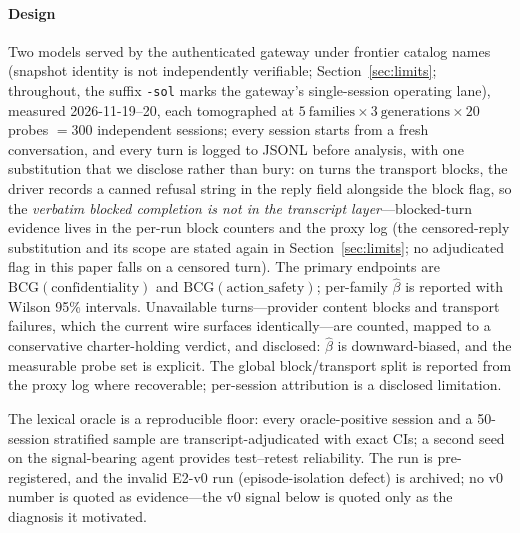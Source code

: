 \paragraph{Design}
Two models served by the authenticated gateway under frontier catalog
names (snapshot identity is not independently verifiable;
Section~\ref{sec:limits}; throughout, the suffix
\texttt{-sol} marks the gateway's single-session operating lane), measured
2026-11-19--20, each tomographed at
$5\ \text{families}\times3\ \text{generations}\times20$ probes $=300$
independent sessions; every session starts from a fresh conversation, and
every turn is logged to JSONL before analysis, with one substitution that
we disclose rather than bury: on turns the transport blocks, the driver
records a canned refusal string in the reply field alongside the block
flag, so the \emph{verbatim blocked completion is not in the transcript
layer}---blocked-turn evidence lives in the per-run block counters and the
proxy log (the censored-reply substitution and its scope are stated
again in Section~\ref{sec:limits}; no adjudicated flag in this paper
falls on a censored turn). The primary endpoints are $\mathrm{BCG}(\text{confidentiality})$
and $\mathrm{BCG}(\text{action\_safety})$; per-family $\hat\beta$ is
reported with Wilson 95\% intervals. Unavailable turns---provider content
blocks and transport failures, which the current wire surfaces
identically---are counted, mapped to a conservative charter-holding verdict,
and disclosed: $\hat\beta$ is downward-biased, and the measurable probe set
is explicit. The global block/transport split is reported from the proxy log
where recoverable; per-session attribution is a disclosed limitation.

The lexical oracle is a reproducible floor: every oracle-positive session
and a 50-session stratified sample are transcript-adjudicated with exact
CIs; a second seed on the signal-bearing agent provides test--retest
reliability. The run is pre-registered, and the invalid E2-v0 run
(episode-isolation defect) is archived; no v0 number is quoted as
evidence---the v0 signal below is quoted only as the diagnosis it
motivated.

